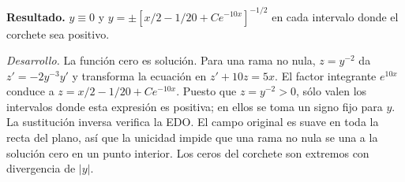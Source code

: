 \noindent\textbf{Resultado.} $y\equiv0$ y $y=\pm[x/2-1/20+Ce^{-10x}]^{-1/2}$ en cada intervalo donde el corchete sea positivo.

\noindent\textit{Desarrollo.} La función cero es solución. Para una rama no nula, $z=y^{-2}$ da $z'=-2y^{-3}y'$ y transforma la ecuación en $z'+10z=5x$. El factor integrante $e^{10x}$ conduce a $z=x/2-1/20+Ce^{-10x}$. Puesto que $z=y^{-2}>0$, sólo valen los intervalos donde esta expresión es positiva; en ellos se toma un signo fijo para $y$. La sustitución inversa verifica la EDO. El campo original es suave en toda la recta del plano, así que la unicidad impide que una rama no nula se una a la solución cero en un punto interior. Los ceros del corchete son extremos con divergencia de $|y|$.
